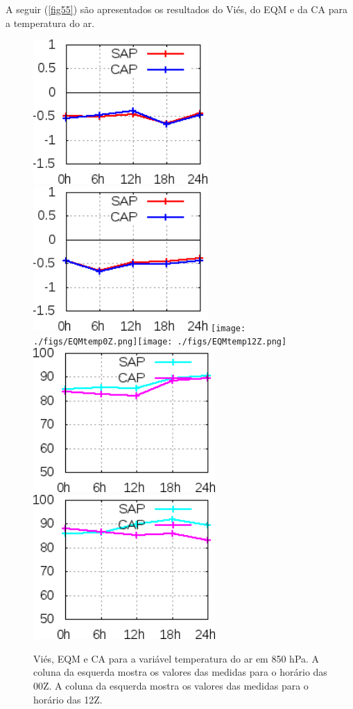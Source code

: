 A seguir (\autoref{fig55}) são apresentados os resultados do Viés, do EQM e da CA para a temperatura do ar.

\begin{figure}[!hbp]
\includegraphics[height=5.5cm]{./figs/VIES850temp0Z.png}\includegraphics[height=5.5cm]{./figs/VIES850temp12Z.png}
\texttt{[image: ./figs/EQMtemp0Z.png]}\texttt{[image: ./figs/EQMtemp12Z.png]}
\includegraphics[height=5.5cm]{./figs/CA850temp0Z.png}\includegraphics[height=5.5cm]{./figs/CA850temp12Z.png}
\caption{Viés, EQM e CA para a variável temperatura do ar em 850 hPa. A coluna da esquerda mostra os valores das medidas para o horário das 00Z. A coluna da esquerda mostra os valores das medidas para o horário das 12Z.}
\label{fig55}
\end{figure}

